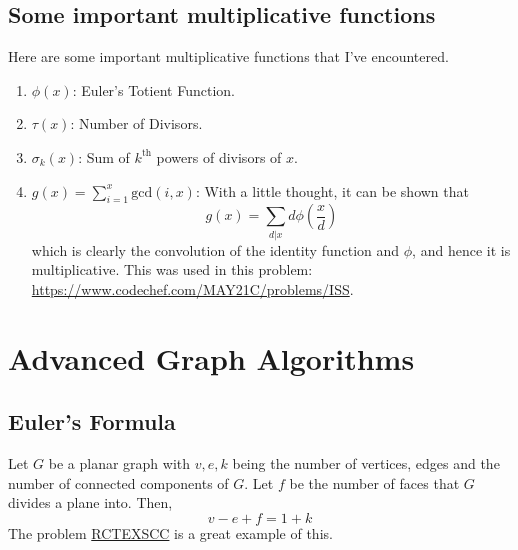 \documentclass[12pt,a4paper]{amsart}
\numberwithin{equation}{section}
\theoremstyle{definition}
\begin{document}
\subsection{Some important multiplicative functions} Here are some important multiplicative functions that I've encountered.

\begin{enumerate}
    \item $\phi(x)$: Euler's Totient Function. 
    \item $\tau(x)$: Number of Divisors.
    \item $\sigma_k(x)$: Sum of $k^\text{th}$ powers of divisors of $x$. 
    \item $g(x) = \sum_{i = 1}^x \text{gcd}(i , x)$: With a little thought, it can be shown that 
    $$g(x) = \sum_{d | x}d\phi\left(\dfrac{x}{d}\right)$$
    which is clearly the convolution of the identity function and $\phi$, and hence it is multiplicative. This was used in this problem: \url{https://www.codechef.com/MAY21C/problems/ISS}.
\end{enumerate}

\section{Advanced Graph Algorithms}

\subsection{Euler's Formula} Let $G$ be a planar graph with $v,e,k$ being the number of vertices, edges and the number of connected components of $G$. Let $f$ be the number of faces that $G$ divides a plane into. Then, 
$$v - e + f = 1 + k$$
The problem \href{https://discuss.codechef.com/t/rctexscc-editorial/83502}{RCTEXSCC} is a great example of this. 
\end{document}
